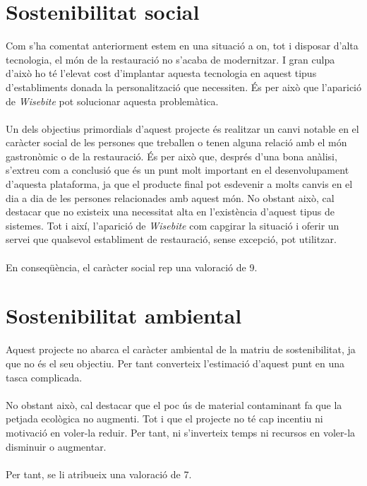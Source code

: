 
\section{Sostenibilitat social}

Com s’ha comentat anteriorment estem en una situació a on, tot i disposar d’alta tecnologia, el món de la restauració no s’acaba de modernitzar. I gran culpa d’això ho té l’elevat cost d’implantar aquesta tecnologia en aquest tipus d’establiments donada la personalització que necessiten. És per això que l’aparició de \textit{Wisebite} pot solucionar aquesta problemàtica.
\\\\
Un dels objectius primordials d’aquest projecte és realitzar un canvi notable en el caràcter social de les persones que treballen o tenen alguna relació amb el món gastronòmic o de la restauració. És per això que, després d’una bona anàlisi, s’extreu com a conclusió que és un punt molt important en el desenvolupament d’aquesta plataforma, ja que el producte final pot esdevenir a molts canvis en el dia a dia de les persones relacionades amb aquest món. No obstant això, cal destacar que no existeix una necessitat alta en l’existència d’aquest tipus de sistemes. Tot i així, l’aparició de \textit{Wisebite} com capgirar la situació i oferir un servei que qualsevol establiment de restauració, sense excepció, pot utilitzar.
\\\\
En conseqüència, el caràcter social rep una valoració de 9.


\section{Sostenibilitat ambiental}

Aquest projecte no abarca el caràcter ambiental de la matriu de sostenibilitat, ja que no és el seu objectiu. Per tant converteix l’estimació d’aquest punt en una tasca complicada.
\\\\
No obstant això, cal destacar que el poc ús de material contaminant fa que la petjada ecològica no augmenti. Tot i que el projecte no té cap incentiu ni motivació en voler-la reduir. Per tant, ni s’inverteix temps ni recursos en voler-la disminuir o augmentar.
\\\\
Per tant, se li atribueix una valoració de 7.

